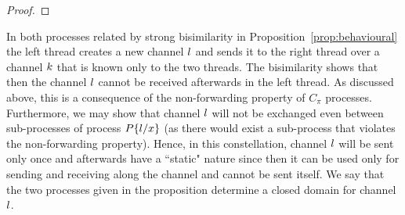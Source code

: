 \begin{proof}

\end{proof}
%


In both processes related by strong bisimilarity in Proposition~\ref{prop:behavioural} the left thread creates a new channel $l$ and sends it to the right thread over a channel $k$ that is known only to the two threads. 
The bisimilarity shows that then the channel $l$ cannot be received afterwards in the left thread. 
As discussed above, this is a consequence of the non-forwarding property of $C_\pi$ processes.
Furthermore, we may show that channel $l$ will not be exchanged even between sub-processes of process $P\{l/x\}$ (as there would exist a sub-process that violates the non-forwarding property). 
Hence, in this constellation, channel $l$ will be sent only once and afterwards have a ``static" nature since then it can be used only for sending and receiving along the channel and cannot be sent itself. 
We say that the two processes given in the proposition determine a closed domain for channel $l$. 



